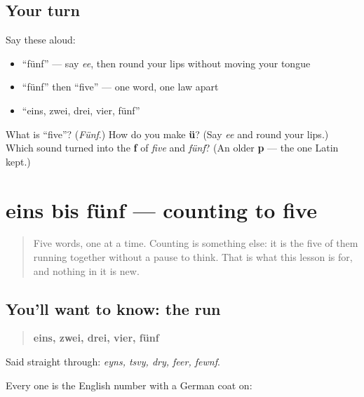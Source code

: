 \subsection*{Your turn}
Say these aloud:

\begin{itemize}
\raggedright
  \item \textquotedblleft{}fünf\textquotedblright{} — say \emph{ee}, then round your lips without moving your tongue
  \item \textquotedblleft{}fünf\textquotedblright{} then \textquotedblleft{}five\textquotedblright{} — one word, one law apart
  \item \textquotedblleft{}eins, zwei, drei, vier, fünf\textquotedblright{}
\end{itemize}

\begin{tcolorbox}[breakable,colback=teal!4,colframe=teal!35!black,title={Before you move on}]
What is \textquotedblleft{}five\textquotedblright{}? (\emph{Fünf}.) How do you make \textbf{ü}? (Say \emph{ee} and round your lips.) Which sound turned into the \textbf{f} of \emph{five} and \emph{fünf}? (An older \textbf{p} — the one Latin kept.)
\end{tcolorbox}
\section[Practice]{eins bis fünf — counting to five}

\label{lesson:GE-C06-zahlen-1-5}



\begin{quote}
Five words, one at a time. Counting is something else: it is the five of them running together without a pause to think. That is what this lesson is for, and nothing in it is new.
\end{quote}

\subsection*{You'll want to know: the run}
\begin{quote}
\textbf{eins, zwei, drei, vier, fünf}
\end{quote}

Said straight through: \emph{eyns, tsvy, dry, feer, fewnf}.

Every one is the English number with a German coat on:

